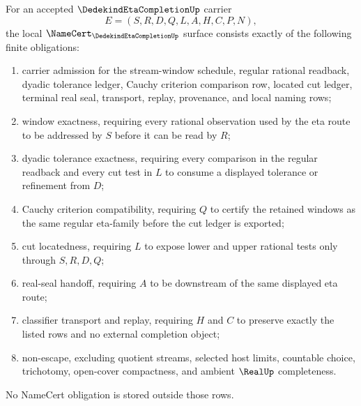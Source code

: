 \begin{theorem}
\label{thm:dedekind-eta-completion-namecert-obligations}
For an accepted $\DedekindEtaCompletionUp$ carrier
$$
E=(S,R,D,Q,L,A,H,C,P,N),
$$
the local $\NameCert_{\DedekindEtaCompletionUp}$ surface consists exactly of the following finite obligations:
\begin{enumerate}
\item carrier admission for the stream-window schedule, regular rational readback, dyadic tolerance ledger, Cauchy criterion comparison row, located cut ledger, terminal real seal, transport, replay, provenance, and local naming rows;
\item window exactness, requiring every rational observation used by the eta route to be addressed by $S$ before it can be read by $R$;
\item dyadic tolerance exactness, requiring every comparison in the regular readback and every cut test in $L$ to consume a displayed tolerance or refinement from $D$;
\item Cauchy criterion compatibility, requiring $Q$ to certify the retained windows as the same regular eta-family before the cut ledger is exported;
\item cut locatedness, requiring $L$ to expose lower and upper rational tests only through $S,R,D,Q$;
\item real-seal handoff, requiring $A$ to be downstream of the same displayed eta route;
\item classifier transport and replay, requiring $H$ and $C$ to preserve exactly the listed rows and no external completion object;
\item non-escape, excluding quotient streams, selected host limits, countable choice, trichotomy, open-cover compactness, and ambient $\RealUp$ completeness.
\end{enumerate}
No NameCert obligation is stored outside those rows.
\end{theorem}

